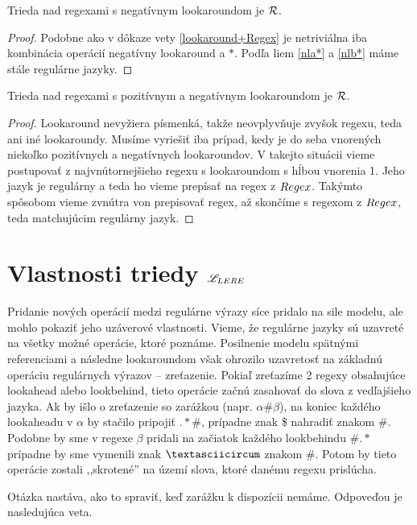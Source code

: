 \begin{veta}\label{nlookaround+R}
Trieda nad regexami s negatívnym lookaroundom je ${\cal R}$.
\end{veta}
\begin{proof}
Podobne ako v dôkaze vety \ref{lookaround+Regex} je netriviálna iba kombinácia operácií negatívny lookaround a $*$. Podľa liem \ref{nla*} a \ref{nlb*} máme stále regulárne jazyky.
\end{proof}

\begin{dosledok}
Trieda nad regexami s pozitívnym a negatívnym lookaroundom je ${\cal R}$.
\end{dosledok}
\begin{proof}
Lookaround nevyžiera písmenká, takže neovplyvňuje zvyšok regexu, teda ani iné lookaroundy. Musíme vyriešiť iba prípad, kedy je do seba vnorených niekoľko pozitívnych a negatívnych lookaroundov. V takejto situácii vieme postupovať z najvnútornejšieho regexu s lookaroundom s hĺbou vnorenia 1. Jeho jazyk je regulárny a teda ho vieme prepísať na regex z $Regex$. Takýmto spôsobom vieme zvnútra von prepisovať regex, až skončíme s regexom z $Regex$, teda matchujúcim regulárny jazyk.
\end{proof}

\section{Vlastnosti triedy $\mathscr{L}_{LERE}$}

Pridanie nových operácií medzi regulárne výrazy síce pridalo na sile modelu, ale mohlo pokaziť jeho uzáverové vlastnosti. Vieme, že regulárne jazyky sú uzavreté na všetky možné operácie, ktoré poznáme. Posilnenie modelu spätnými referenciami a následne lookaroundom však ohrozilo uzavretosť na základnú operáciu regulárnych výrazov -- zreťazenie. Pokiaľ zreťazíme 2 regexy obsahujúce lookahead alebo lookbehind, tieto operácie začnú zasahovať do slova z vedľajšieho jazyka. Ak by išlo o zreťazenie so zarážkou (napr. $\alpha\#\beta$), na koniec každého lookaheadu v $\alpha$ by stačilo pripojiť $.*\#$, prípadne znak \$ nahradiť znakom \#. Podobne by sme v regexe $\beta$ pridali na začiatok každého lookbehindu $\#.*$ prípadne by sme vymenili znak $\textasciicircum$  znakom \#. Potom by tieto operácie zostali ,,skrotené'' na území slova, ktoré danému regexu prislúcha.

Otázka nastáva, ako to spraviť, keď zarážku k dispozícii nemáme. Odpoveďou je nasledujúca veta.

